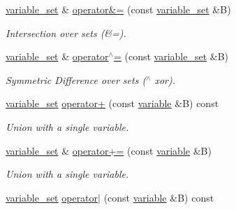 \begin{DoxyCompactItemize}
\hyperlink{classmerlin_1_1variable__set}{variable\+\_\+set} \& \hyperlink{classmerlin_1_1variable__set_a02787f01d7e420e0b899df0d8470ffe6}{operator\&=} (const \hyperlink{classmerlin_1_1variable__set}{variable\+\_\+set} \&B)
\begin{DoxyCompactList}\small\item\em Intersection over sets (\&=). \end{DoxyCompactList}\item 
\hyperlink{classmerlin_1_1variable__set}{variable\+\_\+set} \& \hyperlink{classmerlin_1_1variable__set_a560733eccca448136404d23ea52724c5}{operator$^\wedge$=} (const \hyperlink{classmerlin_1_1variable__set}{variable\+\_\+set} \&B)
\begin{DoxyCompactList}\small\item\em Symmetric Difference over sets ($^\wedge$ xor). \end{DoxyCompactList}\item 
\hypertarget{classmerlin_1_1variable__set_af159ca7d11a0717f02db04f30b451e90}{}\hyperlink{classmerlin_1_1variable__set}{variable\+\_\+set} \hyperlink{classmerlin_1_1variable__set_af159ca7d11a0717f02db04f30b451e90}{operator+} (const \hyperlink{classmerlin_1_1variable}{variable} \&B) const \label{classmerlin_1_1variable__set_af159ca7d11a0717f02db04f30b451e90}

\begin{DoxyCompactList}\small\item\em Union with a single variable. \end{DoxyCompactList}\item 
\hypertarget{classmerlin_1_1variable__set_ae0b8d31cfe300460633c726565769f4e}{}\hyperlink{classmerlin_1_1variable__set}{variable\+\_\+set} \& \hyperlink{classmerlin_1_1variable__set_ae0b8d31cfe300460633c726565769f4e}{operator+=} (const \hyperlink{classmerlin_1_1variable}{variable} \&B)\label{classmerlin_1_1variable__set_ae0b8d31cfe300460633c726565769f4e}

\begin{DoxyCompactList}\small\item\em Union with a single variable. \end{DoxyCompactList}\item 
\hypertarget{classmerlin_1_1variable__set_a098b0421df3a5b1b230c6432376c350a}{}\hyperlink{classmerlin_1_1variable__set}{variable\+\_\+set} \hyperlink{classmerlin_1_1variable__set_a098b0421df3a5b1b230c6432376c350a}{operator$\vert$} (const \hyperlink{classmerlin_1_1variable}{variable} \&B) const \label{classmerlin_1_1variable__set_a098b0421df3a5b1b230c6432376c350a}


\end{DoxyCompactItemize}
